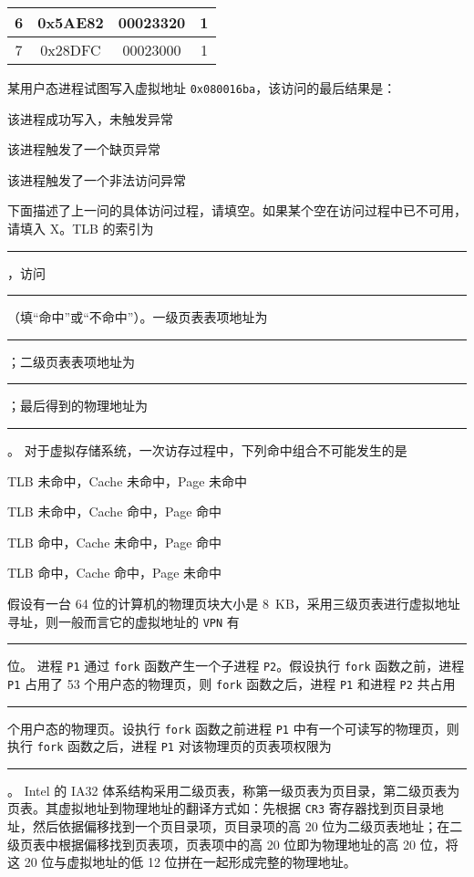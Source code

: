 \begin{problems}
\begin{table}[H]
\begin{tabular}{|c|c|c|c|}
                6 & 0x5AE82 & 00023320 & 1 \\ \hline
                7 & 0x28DFC & 00023000 & 1 \\ \hline
            \end{tabular}
        \end{table}
        \qn 某用户态进程试图写入虚拟地址 \verb|0x080016ba|，该访问的最后结果是：
        \begin{choices}
            \item 该进程成功写入，未触发异常
            \item 该进程触发了一个缺页异常
            \item 该进程触发了一个非法访问异常
        \end{choices}
        \qn 下面描述了上一问的具体访问过程，请填空。如果某个空在访问过程中已不可用，请填入 X。TLB 的索引为 \rule{2.5cm}{0.25mm}，访问 \rule{2.5cm}{0.25mm}（填“命中”或“不命中”）。一级页表表项地址为 \rule{2.5cm}{0.25mm}；二级页表表项地址为 \rule{2.5cm}{0.25mm}；最后得到的物理地址为 \rule{2.5cm}{0.25mm}。
         对于虚拟存储系统，一次访存过程中，下列命中组合不可能发生的是
        \begin{choices}
            \item TLB 未命中，Cache 未命中，Page 未命中
            \item TLB 未命中，Cache 命中，Page 命中
            \item TLB 命中，Cache 未命中，Page 命中
            \item TLB 命中，Cache 命中，Page 未命中
        \end{choices}
         假设有一台 64 位的计算机的物理页块大小是 \SI{8}{KB}，采用三级页表进行虚拟地址寻址，则一般而言它的虚拟地址的 \verb|VPN| 有 \rule{2.5cm}{0.25mm} 位。
         进程 \verb|P1| 通过 \verb|fork| 函数产生一个子进程 \verb|P2|。假设执行 \verb|fork| 函数之前，进程 \verb|P1| 占用了 53 个用户态的物理页，则 \verb|fork| 函数之后，进程 \verb|P1| 和进程 \verb|P2| 共占用 \rule{2.5cm}{0.25mm} 个用户态的物理页。设执行 \verb|fork| 函数之前进程 \verb|P1| 中有一个可读写的物理页，则执行 \verb|fork| 函数之后，进程 \verb|P1| 对该物理页的页表项权限为 \rule{2.5cm}{0.25mm}。
         Intel 的 IA32 体系结构采用二级页表，称第一级页表为页目录，第二级页表为页表。其虚拟地址到物理地址的翻译方式如：先根据 \verb|CR3| 寄存器找到页目录地址，然后依据偏移找到一个页目录项，页目录项的高 20 位为二级页表地址；在二级页表中根据偏移找到页表项，页表项中的高 20 位即为物理地址的高 20 位，将这 20 位与虚拟地址的低 12 位拼在一起形成完整的物理地址。


\end{problems}
